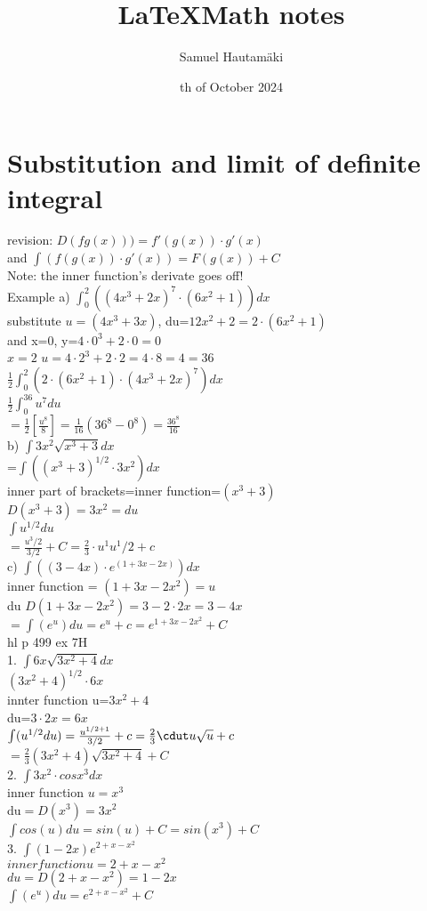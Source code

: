 \documentclass{article}
\title{\LaTeX Math notes}
\author{Samuel Hautamäki}
\date{th of October 2024}
\begin{document}
  \maketitle
   
  \section{Substitution and limit of definite integral}
  revision: $D (f g(x))) = f'(g(x))\cdot g'(x)$\\
  and $\int(f(g(x))\cdot g'(x)) = F(g(x)) + C$\\
  Note: the inner function's derivate goes off!\\
  Example a) $\int_{0}^{2}((4x^3+2x)^7\cdot (6x^2+1))dx$\\
  substitute $u=(4x^3+3x)$, du=$12x^2+2=2\cdot(6x^2+1)$\\
  and x=0, y=$4\cdot 0^3+2\cdot0=0$\\
  $x=2$ $u=4\cdot2^3+2\cdot2=4\cdot8=4=36$\\
  $\frac{1}{2}\int_{0}^{2}(2\cdot(6x^2+1)\cdot(4x^3+2x)^7)dx$\\
  $\frac{1}{2}\int_{0}^{36}u^7du$\\
  $=\frac{1}{2}[\frac{u^8}{8}]=\frac{1}{16}(36^8-0^8)=\frac{36^8}{16}$\\
  b) $\int3x^2\sqrt{x^3+3}dx$\\
  =$\int((x^3+3)^{1/2}\cdot 3x^2)dx$\\
  inner part of brackets=inner function=$(x^3+3)$\\
  $D(x^3+3)=3x^2=du$\\
  $\int u^{1/2} du$\\
  $=\frac{u^3/2}{3/2}+C=\frac{2}{3}\cdot u^1u^1/2+c$\\
  c) $\int((3-4x)\cdot e^{(1+3x-2x)})dx$\\
  inner function = $(1+3x-2x^2)=u$\\
  du $D(1+3x-2x^2)=3-2\cdot2x=3-4x$\\ 
  $=\int(e^u) du=e^u+c=e^{1+3x-2x^2}+C$\\
  hl p 499 ex 7H\\
  1. $\int6x\sqrt{3x^2+4}dx$\\
  $(3x^2+4)^{1/2}\cdot 6x$\\
  innter function u=$3x^2+4$\\
  du=$3\cdot2x=6x$\\
  $\int(u^{1/2}du)=\frac{u^{1/2+1}}{3/2}+c=\frac{2}{3}\cdut u\sqrt{u}+c$\\
  $=\frac{2}{3}(3x^2+4)\sqrt{3x^2+4}+C$\\
  2. $\int 3x^2\cdot cos x^3dx$\\
  inner function $u=x^3$\\
  du$=D(x^3)=3x^2$\\
  $\int cos(u)du=sin(u)+C=sin(x^3)+C$\\
  3. $\int (1-2x)e^{2+x-x^2}$\\
  $inner function u=2+x-x^2$\\
  $du=D(2+x-x^2)=1-2x$\\
  $\int(e^u)du=e^{2+x-x^2}+C$\\

  

  
\end{document}
